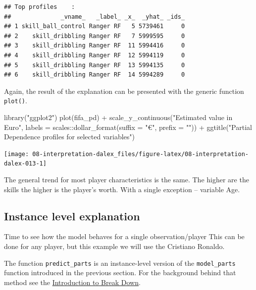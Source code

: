 \documentclass[
]{scrbook}
\newenvironment{Shaded}{\begin{snugshade}}{\end{snugshade}}
\newcommand{\AttributeTok}[1]{\textcolor[rgb]{0.77,0.63,0.00}{#1}}
\newcommand{\FunctionTok}[1]{\textcolor[rgb]{0.00,0.00,0.00}{#1}}
\newcommand{\NormalTok}[1]{#1}
\newcommand{\SpecialCharTok}[1]{\textcolor[rgb]{0.00,0.00,0.00}{#1}}
\newcommand{\StringTok}[1]{\textcolor[rgb]{0.31,0.60,0.02}{#1}}
\renewenvironment{Shaded} {\begin{snugshade}\small} {\end{snugshade}}
\begin{document}
\begin{verbatim}
## Top profiles    : 
##              _vname_   _label_ _x_  _yhat_ _ids_
## 1 skill_ball_control Ranger RF   5 5739461     0
## 2    skill_dribbling Ranger RF   7 5999595     0
## 3    skill_dribbling Ranger RF  11 5994416     0
## 4    skill_dribbling Ranger RF  12 5994119     0
## 5    skill_dribbling Ranger RF  13 5994135     0
## 6    skill_dribbling Ranger RF  14 5994289     0
\end{verbatim}

Again, the result of the explanation can be presented with the generic function \texttt{plot()}.

\begin{Shaded}
\begin{Highlighting}[]
\FunctionTok{library}\NormalTok{(}\StringTok{"ggplot2"}\NormalTok{)}
\FunctionTok{plot}\NormalTok{(fifa\_pd) }\SpecialCharTok{+}
  \FunctionTok{scale\_y\_continuous}\NormalTok{(}\StringTok{"Estimated value in Euro"}\NormalTok{, }\AttributeTok{labels =}\NormalTok{ scales}\SpecialCharTok{::}\FunctionTok{dollar\_format}\NormalTok{(}\AttributeTok{suffix =} \StringTok{"€"}\NormalTok{, }\AttributeTok{prefix =} \StringTok{""}\NormalTok{)) }\SpecialCharTok{+}
  \FunctionTok{ggtitle}\NormalTok{(}\StringTok{"Partial Dependence profiles for selected variables"}\NormalTok{)}
\end{Highlighting}
\end{Shaded}

\begin{center}\texttt{[image: 08-interpretation-dalex\_files/figure-latex/08-interpretation-dalex-013-1]} \end{center}

The general trend for most player characteristics is the same. The higher are the skills the higher is the player's worth. With a single exception -- variable Age.

\hypertarget{interpretability-instance-level}{%
\subsection{Instance level explanation}\label{interpretability-instance-level}}

Time to see how the model behaves for a single observation/player
This can be done for any player, but this example we will use the Cristiano Ronaldo.

The function \texttt{predict\_parts} is an instance-level version of the \texttt{model\_parts} function introduced in the previous section. For the background behind that method see the \href{https://pbiecek.github.io/ema/breakDown.html}{Introduction to Break Down}.
\end{document}

